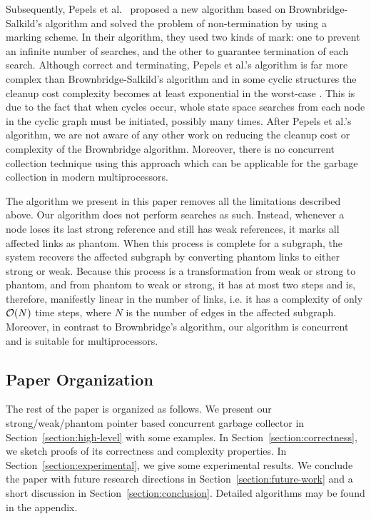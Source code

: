 Subsequently, Pepels et al.~\cite{Pepels1988} proposed a new algorithm based on
Brownbridge-Salkild's algorithm and solved the problem of non-termination by
using a marking scheme. In their algorithm, they used two kinds of mark: one to
prevent an infinite number of searches, and the other to guarantee termination
of each search. Although correct and terminating, Pepels et al.'s algorithm is far more
complex than Brownbridge-Salkild's algorithm and in some cyclic structures the
cleanup cost complexity becomes at least
exponential in the worst-case \cite{Jones1996}. This is due to the fact that when
cycles occur, whole state space searches from
each node in the cyclic graph must be initiated, possibly many times. After Pepels et al.'s algorithm, we are not aware
of any other work on reducing the cleanup cost or complexity of the Brownbridge
algorithm. Moreover, there is no concurrent collection technique using this approach which can be applicable for the garbage collection in modern multiprocessors.

The algorithm we present in this paper removes all the limitations described above.
Our algorithm does not perform searches as such.
Instead, whenever a node
loses its last strong reference and still has weak references, it marks all
affected links as phantom. When this process is complete for
a subgraph, the system recovers the affected subgraph by converting phantom
links to either strong or weak. Because this process is a transformation from
weak or strong to phantom, and from phantom to weak or strong, it has at most
two steps and is, therefore, manifestly linear in the number of links, i.e. it
has a complexity of only ${\cal O}(N)$ time steps,
where $N$ is the number of edges in the
affected subgraph. Moreover, in contrast to Brownbridge's algorithm, our algorithm is concurrent and is suitable for multiprocessors.



\subsection{Paper Organization}
The rest of the paper is organized as follows. We present %
our strong/weak/phantom pointer based concurrent garbage collector in Section~\ref{section:high-level} with some examples. %
In Section~\ref{section:correctness}, we sketch proofs of its correctness and complexity properties. In Section~\ref{section:experimental}, we give some experimental results. We conclude the paper with future research directions in Section~\ref{section:future-work} and a short discussion in Section~\ref{section:conclusion}. Detailed algorithms may be found in the appendix.

